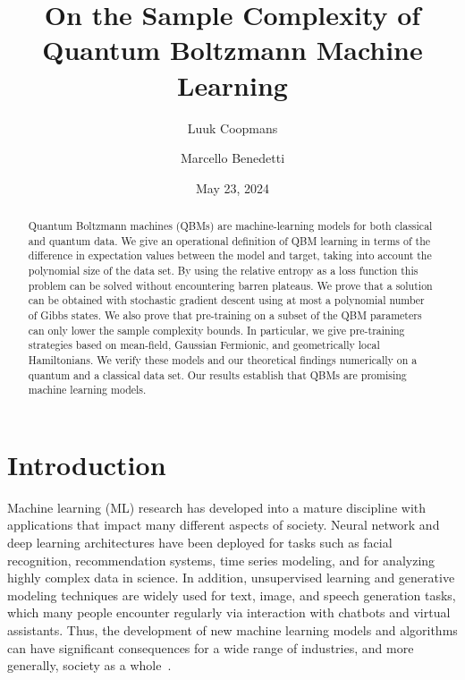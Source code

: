 \documentclass[
    aps,
    prx,
    onecolumn
]{revtex4-2}
\begin{document}
\title{On the Sample Complexity of Quantum Boltzmann Machine Learning}

\author{Luuk Coopmans}

\author{Marcello Benedetti}

\date{May 23, 2024}

\begin{abstract}
Quantum Boltzmann machines (QBMs) are machine-learning models for both classical and quantum data. We give an operational definition of QBM learning in terms of the difference in expectation values between the model and target, taking into account the polynomial size of the data set.
By using the relative entropy as a loss function this problem can be solved without encountering barren plateaus.
We prove that a solution can be obtained with stochastic gradient descent using at most a polynomial number of Gibbs states. 
We also prove that pre-training on a subset of the QBM parameters can only lower the sample complexity bounds. In particular, we give pre-training strategies based on mean-field, Gaussian Fermionic, and geometrically local Hamiltonians. We verify these models and our theoretical findings numerically on a quantum and a classical data set. 
Our results establish that QBMs are promising machine learning models.
\end{abstract}

\maketitle

\section*{Introduction}

Machine learning (ML) research has developed into a mature discipline with applications that impact many different aspects of society. Neural network and deep learning architectures have been deployed for tasks such as facial recognition, recommendation systems, time series modeling, and for analyzing highly complex data in science. In addition, unsupervised learning and generative modeling techniques are widely used for text, image, and speech generation tasks, which many people encounter regularly via interaction with chatbots and virtual assistants. Thus, the development of new machine learning models and algorithms can have significant consequences for a wide range of industries, and more generally, society as a whole~\cite{Bommasani_2021}.
\end{document}
